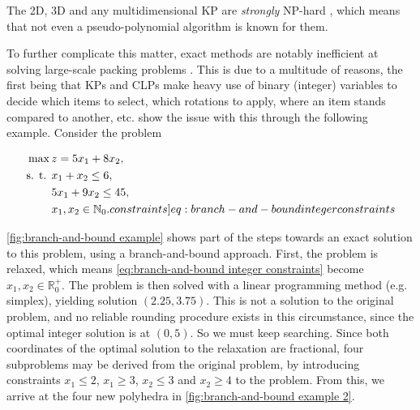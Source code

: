 The 2D, 3D and any multidimensional KP are \emph{strongly} NP-hard \cite{CAPRARA2004,GHOMI2013}, which means that not even a pseudo-polynomial algorithm is known for them.

To further complicate this matter, exact methods are notably inefficient at solving large-scale packing problems \cite{TSAO2024,SANTOS2019,PISINGER2005}. This is due to a multitude of reasons, the first being that KPs and CLPs make heavy use of binary (integer) variables to decide which items to select, which rotations to apply, where an item stands compared to another, etc. \textcite{BRADLEY1977} show the issue with this through the following example. Consider the problem

\begin{subequations}
    \begin{align}
        \max \, &z = 5x_1 + 8x_2,\\
        \text{s. t. } &x_1 + x_2 \leq 6,\\
        &5x_1 + 9x_2 \leq 45,\\
        &x_1, x_2 \in \mathbb{N}_0. \label[constraints]{eq:branch-and-bound integer constraints}
    \end{align}
\end{subequations}

\cref{fig:branch-and-bound example} shows part of the steps towards an exact solution to this problem, using a branch-and-bound approach. First, the problem is relaxed, which means  \cref{eq:branch-and-bound integer constraints} become $x_1, x_2 \in \mathbb{R}^+_0$. The problem is then solved with a linear programming method (e.g. simplex), yielding solution $(2.25,3.75)$. This is not a solution to the original problem, and no reliable rounding procedure exists in this circumstance, since the optimal integer solution is at $(0,5)$. So we must keep searching. Since both coordinates of the optimal solution to the relaxation are fractional, four subproblems may be derived from the original problem, by introducing constraints $x_1 \leq 2$, $x_1 \geq 3$, $x_2 \leq 3$ and $x_2 \geq 4$ to the problem. From this, we arrive at the four new polyhedra in \cref{fig:branch-and-bound example 2}.

